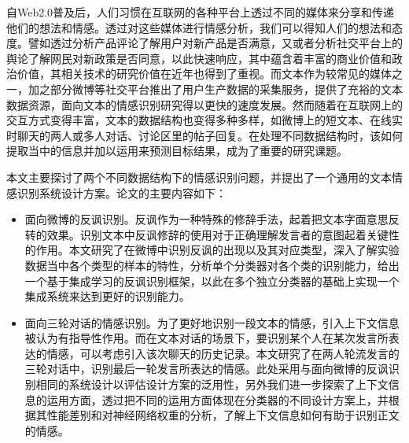 \begin{cabstract}

自Web2.0普及后，人们习惯在互联网的各种平台上透过不同的媒体来分享和传递他们的想法和情感。透过对这些媒体进行情感分析，我们可以得知人们的想法和态度。譬如透过分析产品评论了解用户对新产品是否满意，又或者分析社交平台上的舆论了解网民对新政策是否同意，以此快速响应，其中蕴含着丰富的商业价值和政治价值，其相关技术的研究价值在近年也得到了重视。而文本作为较常见的媒体之一，加之部分微博等社交平台推出了用户生产数据的采集服务，提供了充裕的文本数据资源，面向文本的情感识别研究得以更快的速度发展。然而随着在互联网上的交互方式变得丰富，文本的数据结构也变得多种多样，如微博上的短文本、在线实时聊天的两人或多人对话、讨论区里的帖子回复。在处理不同数据结构时，该如何提取当中的信息并加以运用来预测目标结果，成为了重要的研究课题。

本文主要探讨了两个不同数据结构下的情感识别问题，并提出了一个通用的文本情感识别系统设计方案。论文的主要内容如下：

\begin{itemize}

\item 面向微博的反讽识别。反讽作为一种特殊的修辞手法，起着把文本字面意思反转的效果。识别文本中反讽修辞的使用对于正确理解发言者的意图起着关键性的作用。本文研究了在微博中识别反讽的出现以及其对应类型，深入了解实验数据当中各个类型的样本的特性，分析单个分类器对各个类的识别能力，给出一个基于集成学习的反讽识别框架，以此在多个独立分类器的基础上实现一个集成系统来达到更好的识别能力。

\item 面向三轮对话的情感识别。为了更好地识别一段文本的情感，引入上下文信息被认为有指导性作用。而在文本对话的场景下，要识别某个人在某次发言所表达的情感，可以考虑引入该次聊天的历史记录。本文研究了在两人轮流发言的三轮对话中，识别最后一轮发言所表达的情感。此处采用与面向微博的反讽识别相同的系统设计以评估设计方案的泛用性，另外我们进一步探索了上下文信息的运用方面，透过把不同的运用方面体现在分类器的不同设计方案上，并根据其性能差别和对神经网络权重的分析，了解上下文信息如何有助于识别正文的情感。
\end{itemize}


\end{cabstract}


